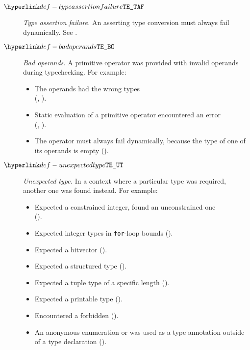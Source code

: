 \begin{description}
\hypertarget{def-typeassertionfailure}{}
\item[$\TypeAssertionFailure$]
  \textit{Type assertion failure.}
  An asserting type conversion must always fail dynamically.
  See .

\hypertarget{def-badoperands}{}
\item[$\BadOperands$]
  \textit{Bad operands.}
  A primitive operator was provided with invalid operands during typechecking.
  For example:
  \begin{itemize}
    \item The operands had the wrong types \\
      (, ).
    \item Static evaluation of a primitive operator encountered an error \\
      (, ).
    \item The operator must always fail dynamically, because the type of one of its operands is empty ().
  \end{itemize}

\hypertarget{def-unexpectedtype}{}
\item[$\UnexpectedType$]
  \textit{Unexpected type.}
  In a context where a particular type was required, another one was found instead.
  For example:
  \begin{itemize}
    \item Expected a constrained integer, found an unconstrained one \\
      ().
    \item Expected integer types in \texttt{for}-loop bounds ().
    \item Expected a bitvector ().
    \item Expected a structured type ().
    \item Expected a tuple type of a specific length ().
    \item Expected a printable type ().
    \item Encountered a forbidden \pendingconstrainedintegertype{} ().
    \item An anonymous enumeration or \structuredtype{} was used as a type annotation outside of a type declaration ().
  \end{itemize}


\end{description}
